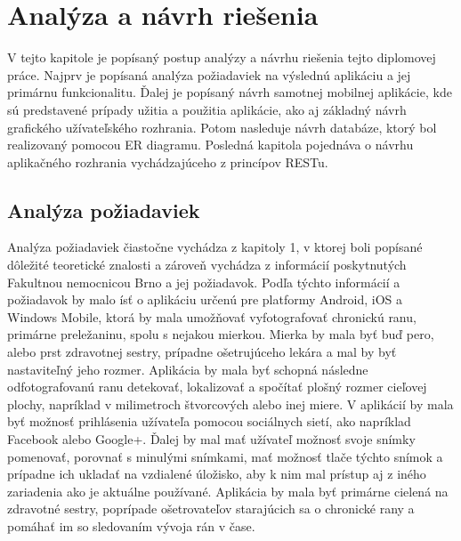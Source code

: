 \chapter{Analýza a návrh riešenia}
\label{chap:analyza-navrh-riesenia}
V tejto kapitole je popísaný postup analýzy a návrhu riešenia tejto diplomovej práce. Najprv je popísaná analýza požiadaviek na výslednú aplikáciu a jej primárnu funkcionalitu. Ďalej je popísaný návrh samotnej mobilnej aplikácie, kde sú predstavené prípady užitia a použitia aplikácie, ako aj základný návrh grafického užívateľského rozhrania. Potom nasleduje návrh databáze, ktorý bol realizovaný pomocou ER diagramu. Posledná kapitola pojednáva o návrhu aplikačného rozhrania vychádzajúceho z princípov RESTu.

\section{Analýza požiadaviek}
Analýza požiadaviek čiastočne vychádza z kapitoly 1, v ktorej boli popísané dôležité teoretické znalosti a zároveň vychádza z informácií poskytnutých Fakultnou nemocnicou Brno a jej požiadavok. Podľa týchto informácií a požiadavok by malo ísť o aplikáciu určenú pre platformy Android, iOS a Windows Mobile, ktorá by mala umožňovať vyfotografovať chronickú ranu, primárne preležaninu, spolu s nejakou mierkou. Mierka by mala byť buď pero, alebo prst zdravotnej sestry, prípadne ošetrujúceho lekára a mal by byť nastaviteľný jeho rozmer. Aplikácia by mala byť schopná následne odfotografovanú ranu detekovať, lokalizovať a spočítať plošný rozmer cieľovej plochy, napríklad v milimetroch štvorcových alebo inej miere. V aplikácií by mala byť možnosť prihlásenia užívateľa pomocou sociálnych sietí, ako napríklad Facebook alebo Google+. Ďalej by mal mať užívateľ možnosť svoje snímky pomenovať, porovnať s minulými snímkami, mať možnosť tlače týchto snímok a prípadne ich ukladať na vzdialené úložisko, aby k nim mal prístup aj z iného zariadenia ako je aktuálne používané. Aplikácia by mala byť primárne cielená na zdravotné sestry, poprípade ošetrovateľov starajúcich sa o chronické rany a pomáhať im so sledovaním vývoja rán v čase. 

